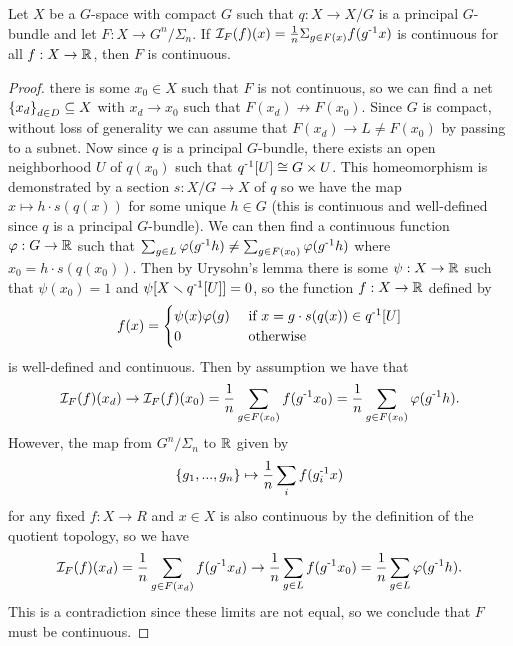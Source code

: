 \begin{lemma}\label{lem:cont-preserving-frame-is-cont}
    Let $X$ be a $G$-space with compact $G$ such that $q : X \to X/G$ is a principal $G$-bundle and let $F : X \to G^n/\Sigma_n$.
    If $\mathcal{I}_F (f) (x) = \frac{1}{n} \Sigma_{g \in F(x)} f(g^{\text{-}1} x)$ is continuous for all $f : X \to \mathbb{R}$, then $F$ is continuous.
    \begin{proof}
        \Afsoc there is some $x_0 \in X$ such that $F$ is not continuous, so we can find a net $\left\{ x_d \right\}_{d \in D} \subseteq X$ with $x_d \to x_0$ such that $F(x_d) \not\to F(x_0)$.
        Since $G$ is compact, without loss of generality we can assume that $F(x_d) \to L \neq F(x_0)$ by passing to a subnet.
        Now since $q$ is a principal $G$-bundle, there exists an open neighborhood $U$ of $q(x_0)$ such that $q^{\text{-}1}[U] \cong G \times U$.
        This homeomorphism is demonstrated by a section $s : X/G \to X$ of $q$ so we have the map $x \mapsto h \cdot s(q(x))$ for some unique $h \in G$ (this is continuous and well-defined since $q$ is a principal $G$-bundle).
        We can then find a continuous function $\varphi : G \to \mathbb{R}$ such that $\sum_{g \in L} \varphi(g^{\text{-}1}h) \neq \sum_{g \in F(x_0)} \varphi(g^{\text{-}1}h)$ where $x_0 = h \cdot s(q(x_0))$.
        Then by Urysohn's lemma there is some $\psi : X \to \mathbb{R}$ such that $\psi(x_0) = 1$ and $\psi[X \smallsetminus q^{\text{-}1}[U]] = 0$, so the function $f : X \to \mathbb{R}$ defined by
        \[
            f(x)
            = \begin{cases}
                \psi(x) \varphi(g) &\text{ if } x = g \cdot s(q(x)) \in q^{\text{-}1}[U] \\
                0 &\text{ otherwise}
            \end{cases}
        \]
        is well-defined and continuous.
        Then by assumption we have that
        \[
            \mathcal{I}_F (f)(x_d)
            \to \mathcal{I}_F (f) (x_0)
            = \frac{1}{n} \sum_{g \in F(x_0)} f(g^{\text{-}1} x_0)
            = \frac{1}{n} \sum_{g \in F(x_0)} \varphi(g^{\text{-}1}h).
        \]
        However, the map from $G^n/\Sigma_n$ to $\mathbb{R}$ given by
        \[
            \left\{ g_1,...,g_n \right\} \mapsto \frac{1}{n} \sum_i f(g_i^{\text{-}1} x)
        \]
        for any fixed $f : X \to R$ and $x \in X$ is also continuous by the definition of the quotient topology, so we have
        \[
            \II_F (f) (x_d)
            = \f{1}{n} \sum_{g \in F(x_d)} f(\inv{g} x_d)
            \to \f{1}{n} \sum_{g \in L} f(\inv{g} x_0) %
            = \f{1}{n} \sum_{g \in L} \varphi(\inv{g}h).
        \]
        This is a contradiction since these limits are not equal, so we conclude that $F$ must be continuous.
    \end{proof}
\end{lemma}

